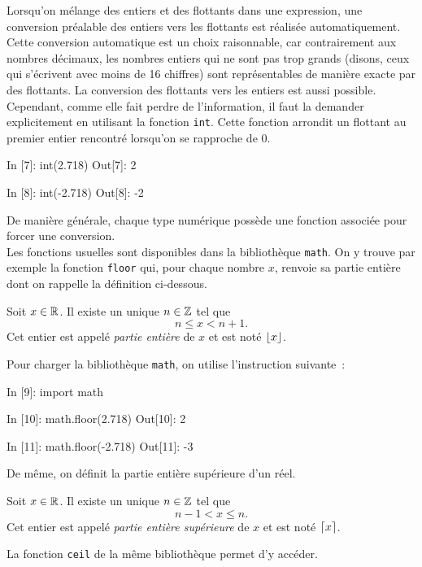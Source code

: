 \documentclass{magnoliaold}
\begin{document}
Lorsqu'on mélange des entiers et des flottants dans une expression,
une conversion préalable des entiers vers les flottants est réalisée automatiquement.
Cette conversion automatique est un choix raisonnable, car contrairement
aux nombres décimaux, les nombres entiers qui ne sont pas trop grands (disons, ceux qui s'écrivent
avec moins de 16 chiffres) sont représentables de manière exacte par des flottants.
La conversion des flottants vers les entiers est aussi possible. Cependant, comme elle fait perdre
de l'information, il faut la demander explicitement en utilisant la fonction \verb_int_.
Cette fonction arrondit un flottant au premier entier rencontré lorsqu'on se rapproche de 0.

\begin{pythoncode}
In [7]: int(2.718)
Out[7]: 2

In [8]: int(-2.718)
Out[8]: -2
\end{pythoncode}

\noindent De manière générale, chaque type numérique possède une fonction associée pour
forcer une conversion.\\

Les fonctions usuelles sont disponibles dans la bibliothèque \verb_math_. On y trouve
par exemple la fonction \verb_floor_ qui, pour chaque nombre $x$, renvoie sa partie entière dont on
rappelle la définition ci-dessous.

\begin{proposition}
Soit $x\in\mathbb{R}$. Il existe un unique $n\in\mathbb{Z}$ tel que
\[n\leq x<n+1.\]
Cet entier est appelé \emph{partie entière} de $x$ et est noté $\left\lfloor x\right\rfloor$.
\end{proposition}

\noindent
Pour charger la bibliothèque \verb_math_, on utilise l'instruction suivante~:

\begin{pythoncode}
In [9]: import math

In [10]: math.floor(2.718)
Out[10]: 2

In [11]: math.floor(-2.718)
Out[11]: -3
\end{pythoncode}

\noindent De même, on définit la partie entière supérieure d'un réel.
\begin{proposition}
Soit $x\in\mathbb{R}$. Il existe un unique $n\in\mathbb{Z}$ tel que
\[n-1< x\leq n.\]
Cet entier est appelé \emph{partie entière supérieure} de $x$ et est noté $\lceil x\rceil$.
\end{proposition}

\noindent
La fonction \verb_ceil_ de la même bibliothèque permet d'y accéder.
\end{document}

